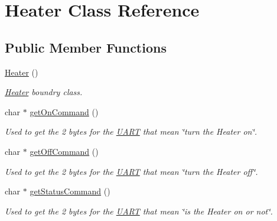 \hypertarget{class_heater}{}\section{Heater Class Reference}
\label{class_heater}
\subsection*{Public Member Functions}
\begin{DoxyCompactItemize}
\item 
\hyperlink{class_heater_aca04268b65aa1c04e9a2a8d4492d34ec}{Heater} ()\hypertarget{class_heater_aca04268b65aa1c04e9a2a8d4492d34ec}{}\label{class_heater_aca04268b65aa1c04e9a2a8d4492d34ec}

\begin{DoxyCompactList}\small\item\em \hyperlink{class_heater}{Heater} boundry class. \end{DoxyCompactList}\item 
char $\ast$ \hyperlink{class_heater_a1e95ae455e4540caa0e8d6fa07685b88}{get\+On\+Command} ()\hypertarget{class_heater_a1e95ae455e4540caa0e8d6fa07685b88}{}\label{class_heater_a1e95ae455e4540caa0e8d6fa07685b88}

\begin{DoxyCompactList}\small\item\em Used to get the 2 bytes for the \hyperlink{class_u_a_r_t}{U\+A\+RT} that mean \char`\"{}turn the Heater on\char`\"{}. \end{DoxyCompactList}\item 
char $\ast$ \hyperlink{class_heater_af8ea50e1a12028006761484278081f4f}{get\+Off\+Command} ()\hypertarget{class_heater_af8ea50e1a12028006761484278081f4f}{}\label{class_heater_af8ea50e1a12028006761484278081f4f}

\begin{DoxyCompactList}\small\item\em Used to get the 2 bytes for the \hyperlink{class_u_a_r_t}{U\+A\+RT} that mean \char`\"{}turn the Heater off\char`\"{}. \end{DoxyCompactList}\item 
char $\ast$ \hyperlink{class_heater_a69dbcc90067c604925c926faa287bf35}{get\+Status\+Command} ()\hypertarget{class_heater_a69dbcc90067c604925c926faa287bf35}{}\label{class_heater_a69dbcc90067c604925c926faa287bf35}

\begin{DoxyCompactList}\small\item\em Used to get the 2 bytes for the \hyperlink{class_u_a_r_t}{U\+A\+RT} that mean \char`\"{}is the Heater on or not\char`\"{}. \end{DoxyCompactList}\end{DoxyCompactItemize}


